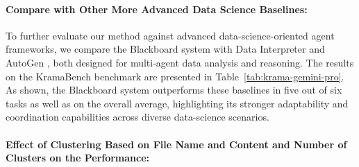 \paragraph{Compare with Other More Advanced Data Science Baselines:}

To further evaluate our method against advanced data-science-oriented agent frameworks, we compare the Blackboard system with Data Interpreter \citep{hong-etal-2025-data} and AutoGen \citep{wu2023autogenenablingnextgenllm}, both designed for multi-agent data analysis and reasoning. The results on the KramaBench benchmark are presented in Table~\ref{tab:krama-gemini-pro}. As shown, the Blackboard system outperforms these baselines in five out of six tasks as well as on the overall average, highlighting its stronger adaptability and coordination capabilities across diverse data-science scenarios.

\begin{table}[t]
    \centering
    \caption{Results on the KramaBench benchmark using Gemini 2.5 Pro as the underlying LLM.}
    \label{tab:krama-gemini-pro}
\end{table}

\paragraph{Effect of Clustering Based on File Name and Content and Number of Clusters on the Performance:}

